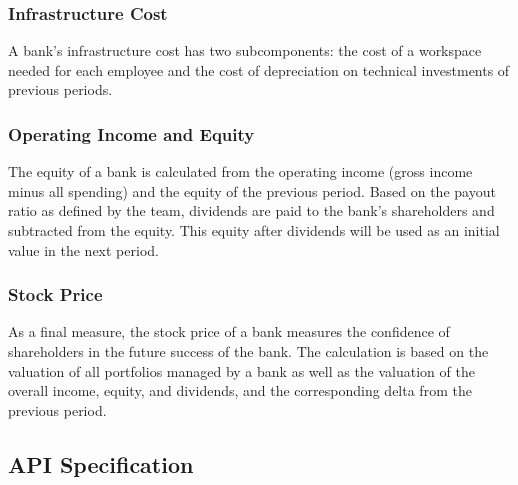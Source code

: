 \subsubsection{Infrastructure Cost}
A bank's infrastructure cost has two subcomponents: the cost of a workspace needed for each employee and the cost of depreciation on technical investments of previous periods.

\subsubsection{Operating Income and Equity}
The equity of a bank is calculated from the operating income (gross income minus all spending) and the equity of the previous period. Based on the payout ratio as defined by the team, dividends are paid to the bank's shareholders and subtracted from the equity. This equity after dividends will be used as an initial value in the next period.

\subsubsection{Stock Price}
As a final measure, the stock price of a bank measures the confidence of shareholders in the future success of the bank. The calculation is based on the valuation of all portfolios managed by a bank as well as the valuation of the overall income, equity, and dividends, and the corresponding delta from the previous period.


\subsection{API Specification}


